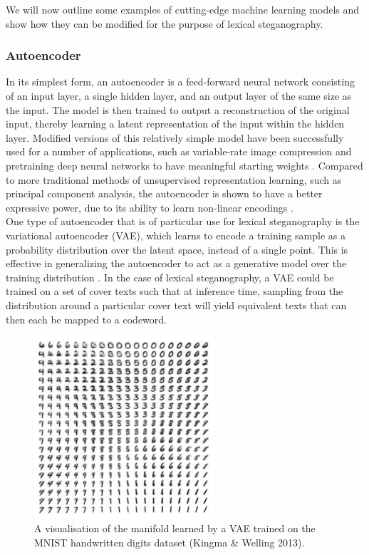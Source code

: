 \documentclass[11pt,a4paper]{article}
\begin{document}
  \nocite{covertweet1}

  \noindent We will now outline some examples of cutting-edge machine learning models and show how they can be modified for the purpose of lexical steganography.


  \subsubsection *{Autoencoder}
  In its simplest form, an autoencoder is a feed-forward neural network consisting of an input layer, a single hidden layer, and an output layer of the same size as the input. The model is then trained to output a reconstruction of the original input, thereby learning a latent representation of the input within the hidden layer. Modified versions of this relatively simple model have been successfully used for a number of applications, such as variable-rate image compression \cite{autoencimagecomp} and pretraining deep neural networks to have meaningful starting weights \cite{autoencstacking}. Compared to more traditional methods of unsupervised representation learning, such as principal component analysis, the autoencoder is shown to have a better expressive power, due to its ability to learn non-linear encodings \cite{goodfellow}.\\
  \indent One type of autoencoder that is of particular use for lexical steganography is the variational autoencoder (VAE), which learns to encode a training sample as a probability distribution over the latent space, instead of a single point. This is effective in generalizing the autoencoder to act as a generative model over the training distribution \cite{vae}. In the case of lexical steganography, a VAE could be trained on a set of cover texts such that at inference time, sampling from the distribution around a particular cover text will yield equivalent texts that can then each be mapped to a codeword.

  \begin{figure}[htp]
    \centering
    \includegraphics[width=0.6\textwidth]{mnist_manifold.png}
    \caption{A visualisation of the manifold learned by a VAE trained on the MNIST handwritten digits dataset (Kingma \& Welling 2013). }
    \label{manifold}
  \end{figure}
\end{document}
